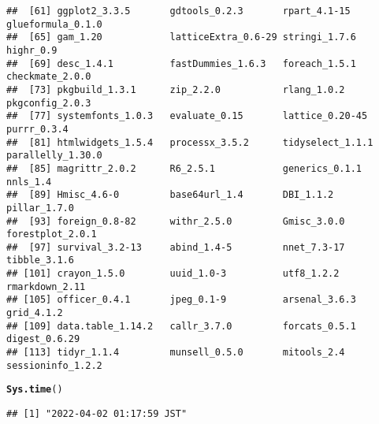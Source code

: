\documentclass{article}\usepackage[]{graphicx}\usepackage[]{color}
\makeatletter
\newcommand{\hlstd}[1]{\textcolor[rgb]{0.345,0.345,0.345}{#1}}%
\newcommand{\hlkwd}[1]{\textcolor[rgb]{0.737,0.353,0.396}{\textbf{#1}}}%
\newenvironment{kframe}{%
 \def\at@end@of@kframe{}%
 \ifinner\ifhmode%
  \def\at@end@of@kframe{\end{minipage}}%
  \begin{minipage}{\columnwidth}%
 \fi\fi%
 \def\FrameCommand##1{\hskip\@totalleftmargin \hskip-\fboxsep
 \colorbox{shadecolor}{##1}\hskip-\fboxsep
     \hskip-\linewidth \hskip-\@totalleftmargin \hskip\columnwidth}%
 \MakeFramed {\advance\hsize-\width
   \@totalleftmargin\z@ \linewidth\hsize
   \@setminipage}}%
 {\par\unskip\endMakeFramed%
 \at@end@of@kframe}
\newenvironment{knitrout}{}{} %
\makeatother
\begin{document}
\begin{knitrout}
\begin{kframe}
\begin{verbatim}
##  [61] ggplot2_3.3.5       gdtools_0.2.3       rpart_4.1-15        glueformula_0.1.0  
##  [65] gam_1.20            latticeExtra_0.6-29 stringi_1.7.6       highr_0.9          
##  [69] desc_1.4.1          fastDummies_1.6.3   foreach_1.5.1       checkmate_2.0.0    
##  [73] pkgbuild_1.3.1      zip_2.2.0           rlang_1.0.2         pkgconfig_2.0.3    
##  [77] systemfonts_1.0.3   evaluate_0.15       lattice_0.20-45     purrr_0.3.4        
##  [81] htmlwidgets_1.5.4   processx_3.5.2      tidyselect_1.1.1    parallelly_1.30.0  
##  [85] magrittr_2.0.2      R6_2.5.1            generics_0.1.1      nnls_1.4           
##  [89] Hmisc_4.6-0         base64url_1.4       DBI_1.1.2           pillar_1.7.0       
##  [93] foreign_0.8-82      withr_2.5.0         Gmisc_3.0.0         forestplot_2.0.1   
##  [97] survival_3.2-13     abind_1.4-5         nnet_7.3-17         tibble_3.1.6       
## [101] crayon_1.5.0        uuid_1.0-3          utf8_1.2.2          rmarkdown_2.11     
## [105] officer_0.4.1       jpeg_0.1-9          arsenal_3.6.3       grid_4.1.2         
## [109] data.table_1.14.2   callr_3.7.0         forcats_0.5.1       digest_0.6.29      
## [113] tidyr_1.1.4         munsell_0.5.0       mitools_2.4         sessioninfo_1.2.2
\end{verbatim}
\begin{alltt}
\hlkwd{Sys.time}\hlstd{()}
\end{alltt}
\begin{verbatim}
## [1] "2022-04-02 01:17:59 JST"
\end{verbatim}
\end{kframe}
\end{knitrout}
\end{document}
